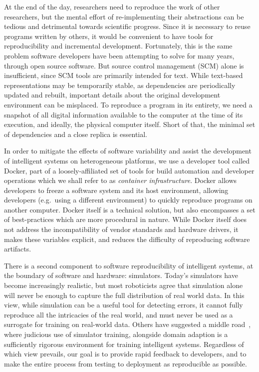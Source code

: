 \documentclass[12pt,initial,twoside,maitrise]{dms}
\numberwithin{equation}{section}
\numberwithin{table}{chapter}
\numberwithin{figure}{chapter}
\begin{document}
At the end of the day, researchers need to reproduce the work of other researchers, but the mental effort of re-implementing their abstractions can be tedious and detrimental towards scientific progress. Since it is necessary to reuse programs written by others, it would be convenient to have tools for reproducibility and incremental development. Fortunately, this is the same problem software developers have been attempting to solve for many years, through open source software. But source control management (SCM) alone is insufficient, since SCM tools are primarily intended for text. While text-based representations may be temporarily stable, as dependencies are periodically updated and rebuilt, important details about the original development environment can be misplaced. To reproduce a program in its entirety, we need a snapshot of all digital information available to the computer at the time of its execution, and ideally, the physical computer itself. Short of that, the minimal set of dependencies and a close replica is essential.

In order to mitigate the effects of software variability and assist the development of intelligent systems on heterogeneous platforms, we use a developer tool called Docker, part of a loosely-affiliated set of tools for build automation and developer operations which we shall refer to as \textit{container infrastructure}. Docker allows developers to freeze a software system and its host environment, allowing developers (e.g.~using a different environment) to quickly reproduce programs on another computer. Docker itself is a technical solution, but also encompasses a set of best-practices which are more procedural in nature. While Docker itself does not address the incompatibility of vendor standards and hardware drivers, it makes these variables explicit, and reduces the difficulty of reproducing software artifacts.

There is a second component to software reproducibility of intelligent systems, at the boundary of software and hardware: simulators. Today's simulators have become increasingly realistic, but most roboticists agree that simulation alone will never be enough to capture the full distribution of real world data. In this view, while simulation can be a useful tool for detecting errors, it cannot fully reproduce all the intricacies of the real world, and must never be used as a surrogate for training on real-world data. Others have suggested a middle road~\citep{bousmalis2018using}, where judicious use of simulator training, alongside domain adaption is a sufficiently rigorous environment for training intelligent systems. Regardless of which view prevails, our goal is to provide rapid feedback to developers, and to make the entire process from testing to deployment as reproducible as possible.
\end{document}
